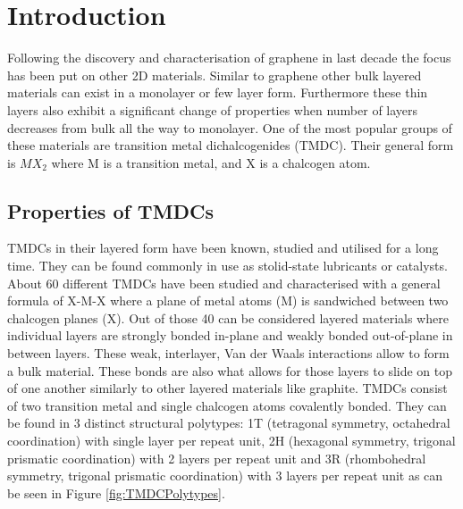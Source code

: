\chapter{Introduction}
	Following the discovery and characterisation of graphene in last decade the focus has been put on other 2D materials. Similar to graphene other bulk layered materials can exist in a monolayer or few layer form. Furthermore these thin layers also exhibit a significant change of properties when number of layers decreases from bulk all the way to monolayer. One of the most popular groups of these materials are transition metal dichalcogenides (TMDC). Their general form is $MX_2$ where M is a transition metal, and X is a chalcogen atom.  

\section{Properties of TMDCs}
	TMDCs in their layered form have been known, studied and utilised for a long time. They can be found commonly in use as stolid-state lubricants or catalysts. About 60 different TMDCs have been studied and characterised with a general formula of X-M-X where a plane of metal atoms (M) is sandwiched between two chalcogen planes (X). Out of those 40 can be considered layered materials where individual layers are strongly bonded in-plane and weakly bonded out-of-plane in between layers. These weak, interlayer, Van der Waals interactions allow to form a bulk material. These bonds are also what allows for those layers to slide on top of one another similarly to other layered materials like graphite. 
	TMDCs consist of two transition metal and single chalcogen atoms covalently bonded. They can be found in 3 distinct structural polytypes: 1T (tetragonal symmetry, octahedral coordination) with single layer per repeat unit, 2H (hexagonal symmetry, trigonal prismatic coordination) with 2 layers per repeat unit and 3R (rhombohedral symmetry, trigonal prismatic coordination) with 3 layers per repeat unit \cite{ElectronicsAndOptoelectronicsOfTwo-dimensionalTransitionMetalDichalcogenides} as can be seen in Figure \ref{fig:TMDCPolytypes}.
	
